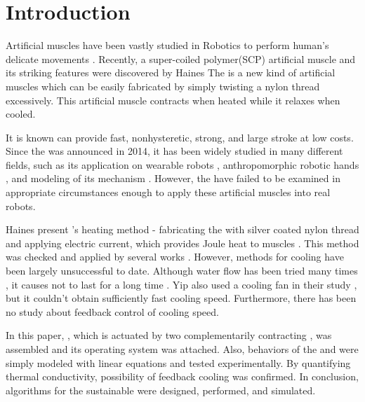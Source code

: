 
\section{Introduction}
Artificial muscles have been vastly studied in Robotics to perform human's delicate movements \cite{ashley}. Recently, a super-coiled polymer(SCP) artificial muscle and its striking features were discovered by Haines \etal \cite{haines} The \scp is a new kind of artificial muscles which can be easily fabricated by simply twisting a nylon thread excessively. This artificial muscle contracts when heated while it relaxes when cooled.

It is known \scps can provide fast, nonhysteretic, strong, and large stroke at low costs\cite{yuan, mirvakili, madden}. 
Since the \scp was announced in 2014, it has been widely studied in many different fields, such as its application on
wearable robots \cite{sphincter, kianzad2}, 
anthropomorphic robotic hands \cite{yip, finger}, 
and modeling of its mechanism \cite{treatise, torsional, youngmodulus, fab_coil, multiscale, healing, kianzad, moretti}. 
However, the \scps have failed to be examined in appropriate circumstances enough to apply these artificial muscles into real robots.

Haines \etalspace present \scpnospace's heating method - fabricating the \scps with silver coated nylon thread and applying electric current, which provides Joule heat to muscles \cite{haines}. This method was checked and applied by several works \cite{yip, mirvakili,kianzad,sphincter,kianzad2}. However, methods for cooling \scps have been largely unsuccessful to date. 
Although water flow has been tried many times \cite{haines,finger},
it causes \scps not to last for a long time \cite{haines}.
Yip \etalspace also used a cooling fan in their study \cite{yip}, but it couldn't obtain sufficiently fast cooling speed.
Furthermore, there has been no study about feedback control of cooling speed.

In this paper, \antanospace, which is actuated by two complementarily contracting \scpsnospace, was assembled and its operating system was attached. Also, behaviors of the \scps and \anta were simply modeled with linear equations and tested experimentally. By quantifying thermal conductivity, possibility of feedback cooling was confirmed. In conclusion, algorithms for the sustainable \apc were designed, performed, and simulated.